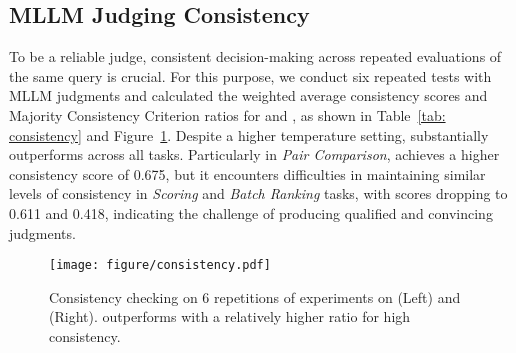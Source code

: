 \subsection{MLLM Judging Consistency}
To be a reliable judge, consistent decision-making across repeated evaluations of the same query is crucial. For this purpose, we conduct six repeated tests with MLLM judgments and calculated the weighted average consistency scores and Majority Consistency Criterion ratios for  and , as shown in Table~\ref{tab: consistency} and Figure~\ref{fig: consitency_bar}. Despite a higher temperature setting,  substantially outperforms  across all tasks. Particularly in \textit{Pair Comparison},  achieves a higher consistency score of 0.675, but it encounters difficulties in maintaining similar levels of consistency in \textit{Scoring} and \textit{Batch Ranking} tasks, with scores dropping to 0.611 and 0.418, indicating the challenge of producing qualified and convincing judgments. 
\begin{figure}
    \centering
    \texttt{[image: figure/consistency.pdf]}
    \vspace{-20pt}
    \caption{
    Consistency checking on 6 repetitions of experiments on  (Left) and  (Right).  outperforms  with a relatively higher ratio for high consistency.
    }
     \vspace{-15pt}
    \label{fig: consitency_bar}
\end{figure}

